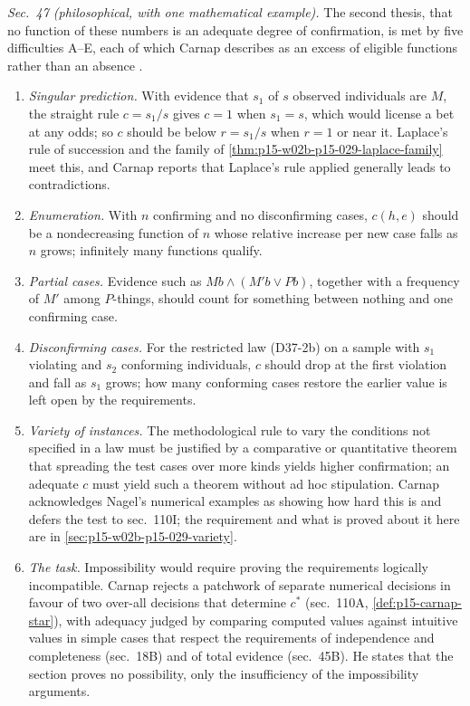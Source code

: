 \emph{Sec.~47 (philosophical, with one mathematical example).} The
second thesis, that no function of these numbers is an adequate degree
of confirmation, is met by five difficulties A--E, each of which Carnap
describes as an excess of eligible functions rather than an absence
\cite[sec.~47, pp.~226--233]{Carnap1950Probability}.
\begin{enumerate}
 \item[A.] \emph{Singular prediction.} With evidence that \(s_1\) of
       \(s\) observed individuals are \(M\), the straight rule
       \(c=s_1/s\) gives \(c=1\) when \(s_1=s\), which would license a
       bet at any odds; so \(c\) should be below \(r=s_1/s\) when
       \(r=1\) or near it. Laplace's rule of succession and the family
       of \cref{thm:p15-w02b-p15-029-laplace-family} meet this, and
       Carnap reports that Laplace's rule applied generally leads to
       contradictions.
 \item[B.] \emph{Enumeration.} With \(n\) confirming and no
       disconfirming cases, \(c(h,e)\) should be a nondecreasing
       function of \(n\) whose relative increase per new case falls as
       \(n\) grows; infinitely many functions qualify.
 \item[C.] \emph{Partial cases.} Evidence such as \(Mb\land(M'b\lor Pb)\),
       together with a frequency of \(M'\) among \(P\)-things, should
       count for something between nothing and one confirming case.
 \item[D.] \emph{Disconfirming cases.} For the restricted law
       (D37-2b) on a sample with \(s_1\) violating and \(s_2\)
       conforming individuals, \(c\) should drop at the first
       violation and fall as \(s_1\) grows; how many conforming cases
       restore the earlier value is left open by the requirements.
 \item[E.] \emph{Variety of instances.} The methodological rule to
       vary the conditions not specified in a law must be justified by
       a comparative or quantitative theorem that spreading the test
       cases over more kinds yields higher confirmation; an adequate
       \(c\) must yield such a theorem without ad hoc stipulation.
       Carnap acknowledges Nagel's numerical examples as showing how
       hard this is and defers the test to sec.~110I; the requirement
       and what is proved about it here are in
       \cref{sec:p15-w02b-p15-029-variety}.
 \item[F.] \emph{The task.} Impossibility would require proving the
       requirements logically incompatible. Carnap rejects a patchwork
       of separate numerical decisions in favour of two over-all
       decisions that determine \(c^*\) (sec.~110A,
       \cref{def:p15-carnap-star}), with adequacy judged by comparing
       computed values against intuitive values in simple cases that
       respect the requirements of independence and completeness
       (sec.~18B) and of total evidence (sec.~45B). He states that the
       section proves no possibility, only the insufficiency of the
       impossibility arguments.
\end{enumerate}

